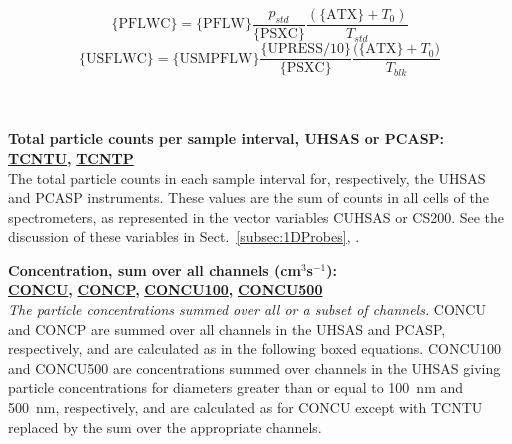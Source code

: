 \begin{hangparagraphs}
{\begin{minipage}[t]{0.9\textwidth}
\begin{equation}
\mathrm{\{PFLWC\}}=\mathrm{\{PFLW\}}\frac{p_{std}}{\mathrm{\{PSXC\}}}\frac{(\mathrm{\{ATX\}}+T_{0})}{T_{std}}\label{eq:12.3}
\end{equation}
\begin{equation}
\mathrm{\{USFLWC\}}=\mathrm{\{USMPFLW\}}\frac{\mathrm{\{UPRESS/10\}}}{\mathrm{\{PSXC\}}}\frac{\mathrm{(\{ATX\}}+T_{0})}{T_{blk}}\label{eq:12.4}
\end{equation}
%
\end{minipage}} \\
\\

\textbf{Total particle counts per sample interval, UHSAS or PCASP:}\textbf{
}\textbf{\uline{TCNTU}}\textbf{, }\textbf{\uline{TCNTP}}\\
The total particle counts in each sample interval for, respectively,
the UHSAS and PCASP instruments. These values are the sum of counts
in all cells of the spectrometers, as represented in the vector variables
CUHSAS or CS200. See the discussion of these variables in Sect.~\ref{subsec:1DProbes},
.

\textbf{Concentration, sum over all channels (cm$^{3}$s$^{-1}$):}\textbf{
}\textbf{\uline{}}\\
\textbf{\uline{CONCU}}\textbf{, }\textbf{\uline{CONCP}}\textbf{,
}\textbf{\uline{CONCU100}}\textbf{, }\textbf{\uline{CONCU500}}\\
\emph{The particle concentrations summed over all or a subset of channels.}
CONCU and CONCP are summed over all
channels in the UHSAS and PCASP, respectively,
and are calculated as in the following boxed equations. CONCU100 and
CONCU500 are concentrations summed over channels in the UHSAS giving
particle concentrations for diameters greater than or equal to 100~nm
and 500~nm, respectively, and are calculated as for CONCU except
with TCNTU replaced by the sum over the appropriate channels.\\
\\
\end{hangparagraphs}
